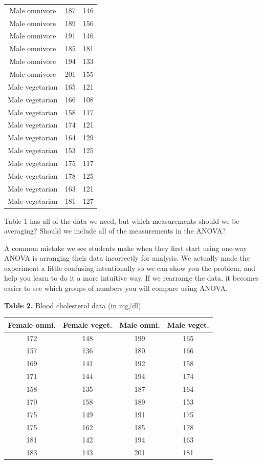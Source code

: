 \documentclass[
]{book}
\begin{document}
\begin{longtable}[]{@{}ccc@{}}
Male omnivore & 187 & 146 \\
Male omnivore & 189 & 156 \\
Male omnivore & 191 & 146 \\
Male omnivore & 185 & 181 \\
Male omnivore & 194 & 133 \\
Male omnivore & 201 & 155 \\
Male vegetarian & 165 & 121 \\
Male vegetarian & 166 & 108 \\
Male vegetarian & 158 & 117 \\
Male vegetarian & 174 & 121 \\
Male vegetarian & 164 & 129 \\
Male vegetarian & 153 & 125 \\
Male vegetarian & 175 & 117 \\
Male vegetarian & 178 & 125 \\
Male vegetarian & 163 & 121 \\
Male vegetarian & 181 & 127 \\
\bottomrule
\end{longtable}

Table 1 has all of the data we need, but which measurements should we be averaging? Should we include all of the measurements in the ANOVA?

A common mistake we see students make when they first start using one-way ANOVA is arranging their data incorrectly for analysis. We actually made the experiment a little confusing intentionally so we can show you the problem, and help you learn to do it a more intuitive way. If we rearrange the data, it becomes easier to see which groups of numbers you will compare using ANOVA.

\textbf{Table 2.} Blood cholesterol data (in mg/dl)

\begin{longtable}[]{@{}cccc@{}}
\toprule
Female omni. & Female veget. & Male omni. & Male veget. \\
\midrule
\endhead
172 & 148 & 199 & 165 \\
157 & 136 & 180 & 166 \\
169 & 141 & 192 & 158 \\
171 & 144 & 194 & 174 \\
158 & 135 & 187 & 164 \\
170 & 158 & 189 & 153 \\
175 & 149 & 191 & 175 \\
175 & 162 & 185 & 178 \\
181 & 142 & 194 & 163 \\
183 & 143 & 201 & 181 \\
\bottomrule
\end{longtable}
\end{document}
